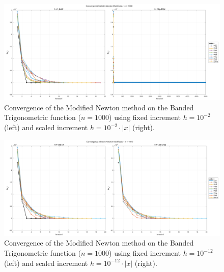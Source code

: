 \documentclass[a4paper,12pt]{article}
\begin{document}
\begin{itemize}
	\newpage
	\begin{figure}[H]
		\centering
		\includegraphics[width=\textwidth]{../immagini/banded_1k_h2.png}
		\caption{Convergence of the Modified Newton method on the Banded Trigonometric function ($n=1000$) using fixed increment $h = 10^{-2}$ (left) and scaled increment $h = 10^{-2}\cdot|x|$ (right).}
		\label{fig:bt_fd_1k_h2}
	\end{figure}
	
	\begin{figure}[H]%
		\centering
		\includegraphics[width=\textwidth]{../immagini/banded_1k_h12.png}
		\caption{Convergence of the Modified Newton method on the Banded Trigonometric function ($n=1000$) using fixed increment $h = 10^{-12}$ (left) and scaled increment $h = 10^{-12}\cdot|x|$ (right).}
		\label{fig:bt_fd_1k_h12}
	\end{figure}
	\newpage
	

\end{itemize}
\end{document}
